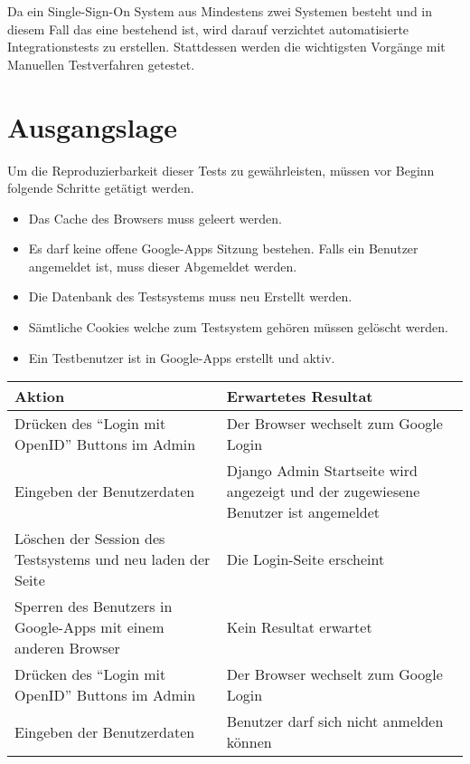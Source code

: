 Da ein Single-Sign-On System aus Mindestens zwei Systemen besteht und in diesem Fall das eine bestehend ist, wird darauf verzichtet automatisierte Integrationstests zu erstellen. Stattdessen werden die wichtigsten Vorgänge mit Manuellen Testverfahren getestet.

\section{Ausgangslage}
\label{sec:TestingAusgangslage}
Um die Reproduzierbarkeit dieser Tests zu gewährleisten, müssen vor Beginn folgende Schritte getätigt werden.

\begin{itemize}
    \item Das Cache des Browsers muss geleert werden.
    \item Es darf keine offene Google-Apps Sitzung bestehen. Falls ein Benutzer
          angemeldet ist, muss dieser Abgemeldet werden.
    \item Die Datenbank des Testsystems muss neu Erstellt werden.
    \item Sämtliche Cookies welche zum Testsystem gehören müssen gelöscht
          werden.
    \item Ein Testbenutzer ist in Google-Apps erstellt und aktiv.
\end{itemize}


\begin{tabular}{p{7cm} p{7cm}}
Aktion & Erwartetes Resultat\\
\hline
Drücken des ``Login mit OpenID'' Buttons im Admin & Der Browser wechselt zum Google Login\\
Eingeben der Benutzerdaten & Django Admin Startseite wird angezeigt und der zugewiesene Benutzer ist angemeldet\\
Löschen der Session des Testsystems und neu laden der Seite & Die Login-Seite erscheint\\
Sperren des Benutzers in Google-Apps mit einem anderen Browser & Kein Resultat erwartet\\
Drücken des ``Login mit OpenID'' Buttons im Admin & Der Browser wechselt zum Google Login\\
Eingeben der Benutzerdaten & Benutzer darf sich nicht anmelden können\\
\end{tabular}
